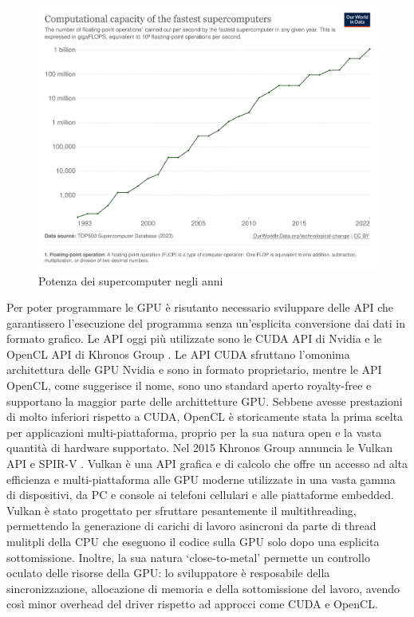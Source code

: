 \begin{figure}[ht]
\centering
\includegraphics[width=.9\linewidth]{images/chapter1/supercomputer_flops.png}
\caption{Potenza dei supercomputer negli anni}
\label{fig:supercomputer_flops}
\end{figure}
    

Per poter programmare le GPU è risutanto necessario sviluppare delle \gls{API} che garantissero l'esecuzione del programma senza un'esplicita conversione dai dati in formato grafico. Le API oggi più utilizzate sono le \gls{CUDA} API di Nvidia \cite[]{Nvidia:CUDA} e le OpenCL API di Khronos Group \cite[]{KG:OpenCL}. Le API CUDA sfruttano l'omonima architettura delle GPU Nvidia e sono in formato proprietario, mentre le API OpenCL, come suggerisce il nome, sono uno standard aperto royalty-free e supportano la maggior parte delle archittetture GPU. Sebbene avesse prestazioni di molto inferiori rispetto a CUDA, OpenCL è storicamente stata la prima scelta per applicazioni multi-piattaforma, proprio per la sua natura open e la vasta quantità di hardware supportato. Nel 2015 Khronos Group annuncia le Vulkan API \cite[]{KG:Vulkan} e SPIR-V \cite[]{KG:SPIR-V}. Vulkan è una API grafica e di calcolo che offre un accesso ad alta efficienza e multi-piattaforma alle GPU moderne utilizzate in una vasta gamma di dispositivi, da PC e console ai telefoni cellulari e alle piattaforme embedded. Vulkan è stato progettato per sfruttare pesantemente il multithreading, permettendo la generazione di carichi di lavoro asincroni da parte di thread mulitpli della CPU che eseguono il codice sulla GPU solo dopo una esplicita sottomissione. Inoltre, la sua natura `close-to-metal' permette un controllo oculato delle risorse della GPU: lo sviluppatore è resposabile della sincronizzazione, allocazione di memoria e della sottomissione del lavoro, avendo così minor overhead del driver rispetto ad approcci come CUDA e OpenCL.

